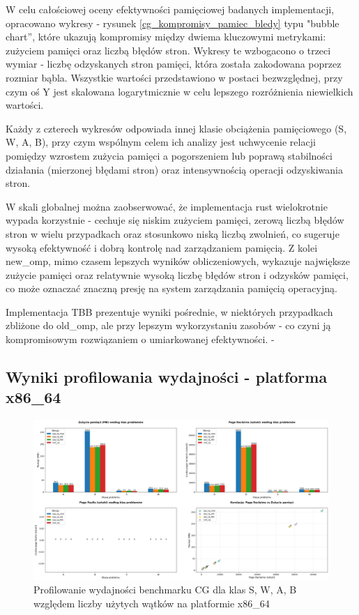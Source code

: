 W celu całościowej oceny efektywności pamięciowej badanych implementacji, opracowano wykresy - rysunek \ref{cg_kompromisy_pamiec_bledy} typu "bubble chart”, które ukazują kompromisy między dwiema kluczowymi metrykami: zużyciem pamięci oraz liczbą błędów stron. Wykresy te wzbogacono o trzeci wymiar - liczbę odzyskanych stron pamięci, która została zakodowana poprzez rozmiar bąbla. Wszystkie wartości przedstawiono w postaci bezwzględnej, przy czym oś Y jest skalowana logarytmicznie w celu lepszego rozróżnienia niewielkich wartości.

Każdy z czterech wykresów odpowiada innej klasie obciążenia pamięciowego (S, W, A, B), przy czym wspólnym celem ich analizy jest uchwycenie relacji pomiędzy wzrostem zużycia pamięci a pogorszeniem lub poprawą stabilności działania (mierzonej błędami stron) oraz intensywnością operacji odzyskiwania stron.

W skali globalnej można zaobserwować, że implementacja rust wielokrotnie wypada korzystnie - cechuje się niskim zużyciem pamięci, zerową liczbą błędów stron w wielu przypadkach oraz stosunkowo niską liczbą zwolnień, co sugeruje wysoką efektywność i dobrą kontrolę nad zarządzaniem pamięcią. Z kolei new\_omp, mimo czasem lepszych wyników obliczeniowych, wykazuje największe zużycie pamięci oraz relatywnie wysoką liczbę błędów stron i odzysków pamięci, co może oznaczać znaczną presję na system zarządzania pamięcią operacyjną.

Implementacja TBB prezentuje wyniki pośrednie, w niektórych przypadkach zbliżone do old\_omp, ale przy lepszym wykorzystaniu zasobów - co czyni ją kompromisowym rozwiązaniem o umiarkowanej efektywności.
-
\subsection{Wyniki profilowania wydajności - platforma x86\_64}
\begin{figure}[H]
    \centering
    \includegraphics[width=\textwidth]{analiza/images/parallel/cg/x86/chart_01_memory_comparison.png}
    \caption{Profilowanie wydajności benchmarku CG dla klas S, W, A, B względem liczby użytych wątków na platformie x86\_64}
    \label{cg_porownanie_zuzycia_pamieci_x86_64}
\end{figure}
